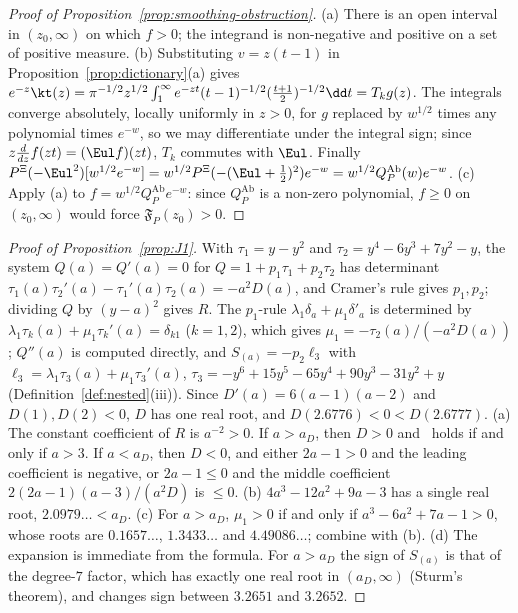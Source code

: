 \begin{proof}[Proof of Proposition~\textup{\ref{prop:smoothing-obstruction}}]
(a) There is an open interval in $(z_0,\infty)$ on which $f>0$; the integrand is non-negative and positive on a set
of positive measure. (b) Substituting $v=z(t-1)$ in Proposition~\ref{prop:dictionary}(a) gives
$e^{-z}\kt(z)=\pi^{-1/2}z^{1/2}\int_1^\infty e^{-zt}(t-1)^{-1/2}(\frac{t+1}2)^{-1/2}\dd t=T_kg(z)$. The integrals
converge absolutely, locally uniformly in $z>0$, for $g$ replaced by $w^{1/2}$ times any polynomial times $e^{-w}$, so
we may differentiate under the integral sign; since $z\frac{d}{dz}f(zt)=(\Eul f)(zt)$, $T_k$ commutes with $\Eul$.
Finally $P^{\Xi}(-\Eul^2)[w^{1/2}e^{-w}]=w^{1/2}P^{\Xi}(-(\Eul+\frac12)^2)e^{-w}=w^{1/2}Q^{\mathrm{Ab}}_P(w)e^{-w}$.
(c) Apply (a) to $f=w^{1/2}Q^{\mathrm{Ab}}_Pe^{-w}$: since $Q^{\mathrm{Ab}}_P$ is a non-zero polynomial, $f\ge0$ on
$(z_0,\infty)$ would force $\mathfrak F_P(z_0)>0$.
\end{proof}

\begin{proof}[Proof of Proposition~\textup{\ref{prop:J1}}]
With $\tau_1=y-y^2$ and $\tau_2=y^4-6y^3+7y^2-y$, the system $Q(a)=Q'(a)=0$ for $Q=1+p_1\tau_1+p_2\tau_2$ has
determinant $\tau_1(a)\tau_2'(a)-\tau_1'(a)\tau_2(a)=-a^2D(a)$, and Cramer's rule gives $p_1,p_2$; dividing $Q$ by
$(y-a)^2$ gives $R$. The $p_1$-rule $\lambda_1\delta_a+\mu_1\delta'_a$ is determined by
$\lambda_1\tau_k(a)+\mu_1\tau_k'(a)=\delta_{k1}$ ($k=1,2$), which gives $\mu_1=-\tau_2(a)/(-a^2D(a))$; $Q''(a)$ is
computed directly, and $S_{(a)}=-p_2\ell_3$ with $\ell_3=\lambda_1\tau_3(a)+\mu_1\tau_3'(a)$,
$\tau_3=-y^6+15y^5-65y^4+90y^3-31y^2+y$ (Definition~\ref{def:nested}(iii)). Since $D'(a)=6(a-1)(a-2)$ and
$D(1),D(2)<0$, $D$ has one real root, and $D(2.6776)<0<D(2.6777)$.
(a) The constant coefficient of $R$ is $a^{-2}>0$. If $a>a_D$, then $D>0$ and \Rp\ holds if and only if $a>3$. If
$a<a_D$, then $D<0$, and either $2a-1>0$ and the leading coefficient is negative, or $2a-1\le0$ and the middle
coefficient $2(2a-1)(a-3)/(a^2D)$ is $\le0$.
(b) $4a^3-12a^2+9a-3$ has a single real root, $2.0979\ldots<a_D$.
(c) For $a>a_D$, $\mu_1>0$ if and only if $a^3-6a^2+7a-1>0$, whose roots are $0.1657\ldots$, $1.3433\ldots$ and
$4.49086\ldots$; combine with (b).
(d) The expansion is immediate from the formula. For $a>a_D$ the sign of $S_{(a)}$ is that of the degree-$7$ factor,
which has exactly one real root in $(a_D,\infty)$ (Sturm's theorem), and changes sign between $3.2651$ and $3.2652$.
\end{proof}

